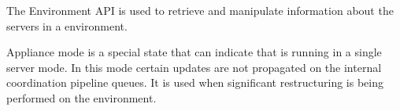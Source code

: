 The Environment API is used to retrieve and manipulate information about the servers in
a \Rapture environment.

Appliance mode is a special state that can indicate that \Rapture is running in a single server mode. In this mode
certain updates are not propagated on the internal \Rapture coordination pipeline queues. It is used when significant restructuring
is being performed on the environment.
